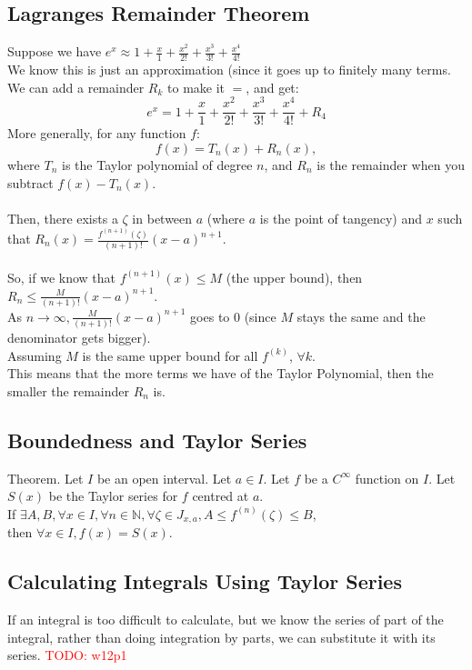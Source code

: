 \documentclass{article}
\newcommand\todo[1]{\textcolor{red}{TODO: {#1}}}
\begin{document}
\subsection{Lagranges Remainder Theorem}
Suppose we have $e^x \approx 1 + \frac{x}{1} + \frac{x^2}{2!} + \frac{x^3}{3!} + \frac{x^4}{4!}$\\
We know this is just an approximation (since it goes up to finitely many terms. We can add a remainder $R_k$ to make it $=$, and get:
$$e^x = 1 + \frac{x}{1} + \frac{x^2}{2!} + \frac{x^3}{3!} + \frac{x^4}{4!} + R_4$$
More generally, for any function $f$:
$$f(x) = T_n(x) + R_n(x),$$
where $T_n$ is the Taylor polynomial of degree $n$, and $R_n$ is the remainder when you subtract $f(x) - T_n(x)$.\\
\\
Then, there exists a $\zeta$ in between $a$ (where $a$ is the point of tangency) and $x$ such that $R_n(x) = \frac{f^{(n+1)}(\zeta)}{(n+1)!}(x-a)^{n+1}$.\\
\\
So, if we know that $f^{(n+1)}(x) \leq M$ (the upper bound), then $R_n \leq \frac{M}{(n+1)!}(x-a)^{n+1}$.\\
As $n \to \infty, \frac{M}{(n+1)!}(x-a)^{n+1}$ goes to $0$ (since $M$ stays the same and the denominator gets bigger).\\
Assuming $M$ is the same upper bound for all $f^{(k)}$, $\forall k$.\\
This means that the more terms we have of the Taylor Polynomial, then the smaller the remainder $R_n$ is. 

\subsection{Boundedness and Taylor Series}
Theorem. Let $I$ be an open interval. Let $a \in I$. Let $f$ be a $C^\infty$ function on $I$. Let $S(x)$ be the Taylor series for $f$ centred at $a$.\\
If $\exists A,B, \forall x \in I, \forall n \in \mathbb{N}, \forall \zeta \in J_{x,a}, A \leq f^{(n)}(\zeta) \leq B$, \\
then $\forall x \in I, f(x) = S(x)$.

\subsection{Calculating Integrals Using Taylor Series}
If an integral is too difficult to calculate, but we know the series of part of the integral, rather than doing integration by parts, we can substitute it with its series.
\todo{w12p1}
\end{document}
